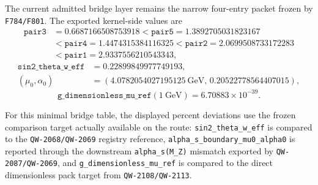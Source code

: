 \documentclass[11pt,a4paper]{article}
\begin{document}
The current admitted bridge layer remains the narrow four-entry packet frozen by
\texttt{F784/F801}. The exported kernel-side values are
\[
\begin{aligned}
\texttt{pair3}&=0.6687166508753918 < \texttt{pair5}=1.3892705031823167 \\
&< \texttt{pair4}=1.4474315384116325 < \texttt{pair2}=2.0699508733172283 \\
&< \texttt{pair1}=2.9337556210543343,
\end{aligned}
\]
\[
\begin{aligned}
\texttt{sin2\_theta\_w\_eff}&=0.22899849977749193, \\
(\mu_0,\alpha_0)&=(4.0782054027195125\ \mathrm{GeV},\,0.20522778564407015),
\end{aligned}
\]
\[
\texttt{g\_dimensionless\_mu\_ref}(1\ \mathrm{GeV})=6.70883\times 10^{-39}.
\]

For this minimal bridge table, the displayed percent deviations use the frozen
comparison target actually available on the route:
\texttt{sin2\_theta\_w\_eff} is compared to the \texttt{QW-2068/QW-2069}
registry reference, \texttt{alpha\_s\_boundary\_mu0\_alpha0} is reported
through the downstream \texttt{alpha\_s(M\_Z)} mismatch exported by
\texttt{QW-2087/QW-2069}, and \texttt{g\_dimensionless\_mu\_ref} is compared to
the direct dimensionless pack target from \texttt{QW-2108/QW-2113}.
\end{document}
